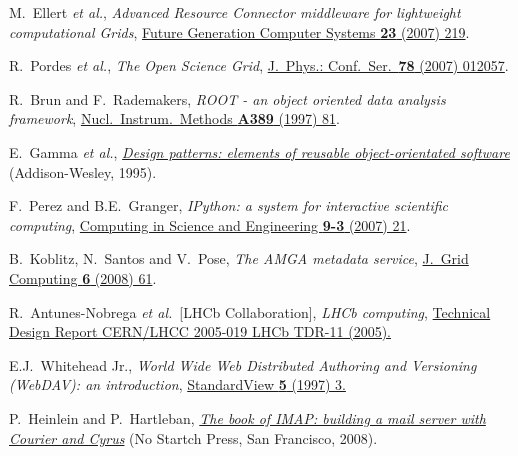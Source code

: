 \documentclass{elsart}
\def\etal {\textit{et al.}}
\begin{document}
\begin{thebibliography}{00}
 M.~Ellert \etal,
\textit{Advanced Resource Connector middleware for lightweight
computational Grids},
\href{http://dx.doi.org/10.1016/j.future.2006.05.008}
{Future Generation Computer Systems \textbf{23} (2007) 219}.
  

 R.~Pordes \etal,
\textit{The Open Science Grid},
\href{http://dx.doi.org/10.1088/1742-6596/78/1/012057}
{J.~Phys.: Conf.\ Ser.\ \textbf{78} (2007) 012057}.

 R.~Brun and F.~Rademakers,
\textit{ROOT - an object oriented data analysis framework},
\href{http://dx.doi.org/10.1016/S0168-9002(97)00048-X}
{Nucl.\ Instrum.\ Methods \textbf{A389} (1997) 81}.

  E.~Gamma \etal,
  \href{http://www.pearsonhighered.com/educator/academic/product/0,,0201633612,00%2Ben-USS_01DBC.html}
{\textit{Design patterns: elements of reusable object-orientated software}}
(Addison-Wesley, 1995).

 F.~Perez and B.E.~Granger,
\textit{IPython: a system for interactive scientific computing},
\href{http://dx.doi.org/10.1109/MCSE.2007.53}
{Computing in Science and Engineering \textbf{9-3} (2007) 21}.

 B.~Koblitz, N.~Santos and V.~Pose,
\textit{The AMGA metadata service},
\href{http://dx.doi.org/10.1007/s10723-007-9084-6}
{J.~Grid Computing \textbf{6} (2008) 61}.

R.~Antunes-Nobrega \etal\ [LHCb Collaboration],
\textit{LHCb computing},
\href{http://cdsweb.cern.ch/record/835156}
{Technical Design Report CERN/LHCC 2005-019 LHCb TDR-11 (2005).}

 E.J.~Whitehead Jr.,
\textit{World Wide Web Distributed Authoring and Versioning (WebDAV):
an introduction},
\href{http://dx.doi.org/10.1145/253452.253458}
{StandardView \textbf{5} (1997) 3.}

 P.~Heinlein and P.~Hartleban,
\href{http://nostarch.com/imap.htm}
{\textit{The book of IMAP: building a mail server with Courier and Cyrus}}
(No Startch Press, San Francisco, 2008).


\end{thebibliography}
\end{document}
